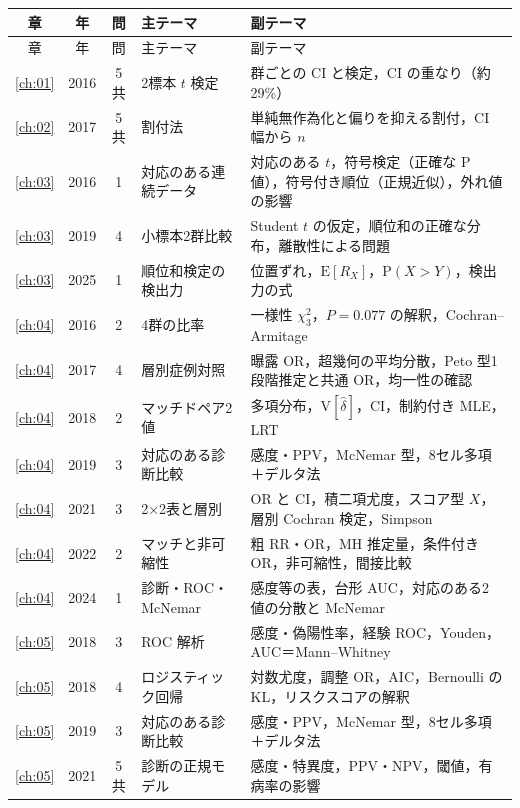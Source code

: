 \documentclass[a4paper,11pt,openany]{ltjsbook}
\newcommand{\E}{\mathrm{E}}
\newcommand{\V}{\mathrm{V}}
\newcommand{\Prob}{\mathrm{P}}
\begin{document}
\begin{center}\scriptsize
\setlength{\tabcolsep}{3pt}
\begin{longtable}{@{}cccL{36mm}L{78mm}@{}}
\toprule
章 & 年 & 問 & 主テーマ & 副テーマ\\
\midrule
\endfirsthead
\toprule
章 & 年 & 問 & 主テーマ & 副テーマ\\
\midrule
\endhead
\bottomrule
\endfoot
\ref{ch:01} & 2016 & 5共 & 2標本 $t$ 検定 & 群ごとの CI と検定，CI の重なり（約29\%）\\
\midrule
\ref{ch:02} & 2017 & 5共 & 割付法 & 単純無作為化と偏りを抑える割付，CI 幅から $n$\\
\midrule
\ref{ch:03} & 2016 & 1 & 対応のある連続データ & 対応のある $t$，符号検定（正確な P 値），符号付き順位（正規近似），外れ値の影響\\
\ref{ch:03} & 2019 & 4 & 小標本2群比較 & Student $t$ の仮定，順位和の正確な分布，離散性による問題\\
\ref{ch:03} & 2025 & 1 & 順位和検定の検出力 & 位置ずれ，$\E[R_X]$，$\Prob(X>Y)$，検出力の式\\
\midrule
\ref{ch:04} & 2016 & 2 & 4群の比率 & 一様性 $\chi^2_3$，$P=0.077$ の解釈，Cochran--Armitage\\
\ref{ch:04} & 2017 & 4 & 層別症例対照 & 曝露 OR，超幾何の平均分散，Peto 型1段階推定と共通 OR，均一性の確認\\
\ref{ch:04} & 2018 & 2 & マッチドペア2 値 & 多項分布，$\V[\hat\delta]$，CI，制約付き MLE，LRT\\
\ref{ch:04} & 2019 & 3 & 対応のある診断比較 & 感度・PPV，McNemar 型，8セル多項＋デルタ法\\
\ref{ch:04} & 2021 & 3 & 2×2表と層別 & OR と CI，積二項尤度，スコア型 $X$，層別 Cochran 検定，Simpson\\
\ref{ch:04} & 2022 & 2 & マッチと非可縮性 & 粗 RR・OR，MH 推定量，条件付き OR，非可縮性，間接比較\\
\ref{ch:04} & 2024 & 1 & 診断・ROC・McNemar & 感度等の表，台形 AUC，対応のある2 値の分散と McNemar\\
\midrule
\ref{ch:05} & 2018 & 3 & ROC 解析 & 感度・偽陽性率，経験 ROC，Youden，AUC＝Mann--Whitney\\
\ref{ch:05} & 2018 & 4 & ロジスティック回帰 & 対数尤度，調整 OR，AIC，Bernoulli の KL，リスクスコアの解釈\\
\ref{ch:05} & 2019 & 3 & 対応のある診断比較 & 感度・PPV，McNemar 型，8セル多項＋デルタ法\\
\ref{ch:05} & 2021 & 5共 & 診断の正規モデル & 感度・特異度，PPV・NPV，閾値，有病率の影響\\

\end{longtable}
\end{center}
\end{document}
